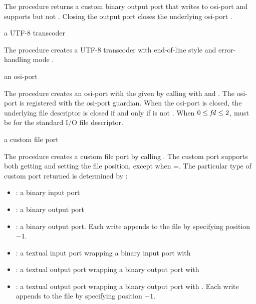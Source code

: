 The  procedure returns a custom binary
output port that writes to osi-port  and supports
 but not . Closing the
output port closes the underlying osi-port .

\begin{procedure}
\end{procedure}
\returns{} a UTF-8 transcoder

The  procedure creates a UTF-8 transcoder
with end-of-line style  and error-handling mode
.

\begin{procedure}
\end{procedure}
\returns{} an osi-port

The  procedure creates an osi-port with the given
 by calling  with  and
. The osi-port is registered with the osi-port
guardian. When the osi-port is closed, the
underlying file descriptor  is closed if and only if
 is not . When $0 \le \var{fd} \le 2$,
 must be  for the standard I/O file descriptor.

\begin{procedure}
\end{procedure}
\returns{} a custom file port

The  procedure creates a custom file port by calling
. The custom
port supports both getting and setting the file position, except when
=. The particular type of custom port returned
is determined by :
\begin{itemize}
  \item {}: a binary input port
  \item {}: a binary output port
  \item {}: a binary output port.
    Each write appends to the file by specifying position $-1$.
  \item {}: a textual input port wrapping a binary input
    port with 
  \item {}: a textual output port wrapping a binary
    output port with 
  \item {}: a textual output port wrapping a binary output
    port with . Each write appends to the file by
    specifying position $-1$.
\end{itemize}

